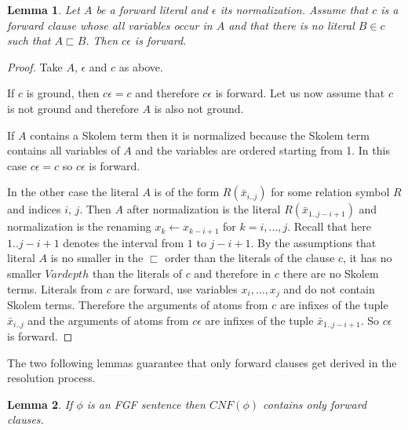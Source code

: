 \documentclass[english, shortabstract]{iithesis}
\theoremstyle{definition} \newtheorem{definition}{Definition}[chapter]
\theoremstyle{remark} \newtheorem{remark}[definition]{Observation}
\theoremstyle{plain} \newtheorem{theorem}[definition]{Theorem}
\theoremstyle{plain} \newtheorem{lemma}[definition]{Lemma}
\newcommand{\subst}[2]{#1 \leftarrow #2}
\begin{document}
\begin{lemma}\label{lem:normalization}
Let $A$ be a forward literal and $\epsilon$ its normalization. 
Assume that $c$ is a forward clause whose all variables occur in $A$ and 
that there is no literal $B\in c$ such that $A\sqsubset B$.
Then $c\epsilon$ is forward.
\end{lemma}
\begin{proof}
Take $A$, $\epsilon$ and $c$ as above.

If $c$ is ground, then $c\epsilon=c$ and therefore $c\epsilon$ is forward.
Let us now assume that $c$ is not ground and therefore $A$ is also not ground.

If $A$ contains a Skolem term then it is normalized
because the Skolem term contains all variables of $A$ and the variables are ordered starting from 1.
In this case $c\epsilon=c$ so $c\epsilon$ is forward.

In the other case the literal $A$ is of the form $R(\bar{x}_{i..j})$ for some relation symbol $R$ and indices $i$, $j$.
Then $A$ after normalization is the literal $R(\bar{x}_{1..j-i+1})$ and normalization is the renaming $\subst{x_k}{x_{k-i+1}}$ for $k=i,\dots,j$.
Recall that here $1..j-i+1$ denotes the interval from $1$ to $j-i+1$.
By the assumptions that literal $A$ is no smaller in the $\sqsubset$ order than the literals of the clause $c$, 
it has no smaller $\mathit{Vardepth}$ than the literals of $c$ and therefore in $c$ there are no Skolem terms.
Literals from $c$ are forward, use variables $x_i, \dots, x_j$ and do not contain Skolem terms.
Therefore the arguments of atoms from $c$ are infixes of the tuple $\bar{x}_{i..j}$ and 
the arguments of atoms from $c\epsilon$ are infixes of the tuple $\bar{x}_{1..j-i+1}$.
So $c\epsilon$ is forward.
\end{proof}

The two following lemmas guarantee that only forward clauses get derived in the resolution process.
\begin{lemma}\label{lem:basis}
If $\phi$ is an FGF sentence then $\mathit{CNF}(\phi)$ contains only forward clauses.
\end{lemma}
\end{document}
